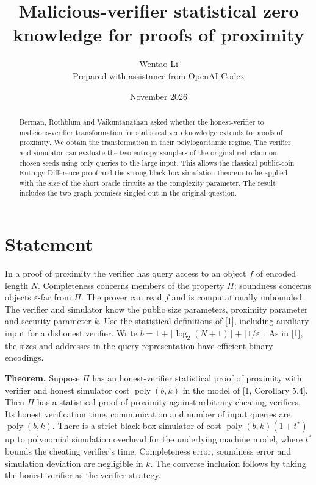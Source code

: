 \documentclass[11pt]{article}
\title{Malicious-verifier statistical zero knowledge for proofs of proximity}
\author{Wentao Li\\[2pt]\small Prepared with assistance from OpenAI Codex}
\date{November 2026}
\begin{document}
\maketitle
\begin{abstract}
Berman, Rothblum and Vaikuntanathan asked whether the honest-verifier to malicious-verifier transformation for statistical zero knowledge extends to proofs of proximity. We obtain the transformation in their polylogarithmic regime. The verifier and simulator can evaluate the two entropy samplers of the original reduction on chosen seeds using only queries to the large input. This allows the classical public-coin Entropy Difference proof and the strong black-box simulation theorem to be applied with the size of the short oracle circuits as the complexity parameter. The result includes the two graph promises singled out in the original question.
\end{abstract}

\section{Statement}
In a proof of proximity the verifier has query access to an object $f$ of encoded length $N$. Completeness concerns members of the property $\Pi$; soundness concerns objects $\varepsilon$-far from $\Pi$. The prover can read $f$ and is computationally unbounded. The verifier and simulator know the public size parameters, proximity parameter and security parameter $k$. Use the statistical definitions of [1], including auxiliary input for a dishonest verifier. Write $b=1+\lceil\log_2(N+1)\rceil+\lceil1/\varepsilon\rceil$. As in [1], the sizes and addresses in the query representation have efficient binary encodings.

\textbf{Theorem.} Suppose $\Pi$ has an honest-verifier statistical proof of proximity with verifier and honest simulator cost $\operatorname{poly}(b,k)$ in the model of [1, Corollary 5.4]. Then $\Pi$ has a statistical proof of proximity against arbitrary cheating verifiers. Its honest verification time, communication and number of input queries are $\operatorname{poly}(b,k)$. There is a strict black-box simulator of cost $\operatorname{poly}(b,k)(1+t^*)$ up to polynomial simulation overhead for the underlying machine model, where $t^*$ bounds the cheating verifier's time. Completeness error, soundness error and simulation deviation are negligible in $k$. The converse inclusion follows by taking the honest verifier as the verifier strategy.
\end{document}
